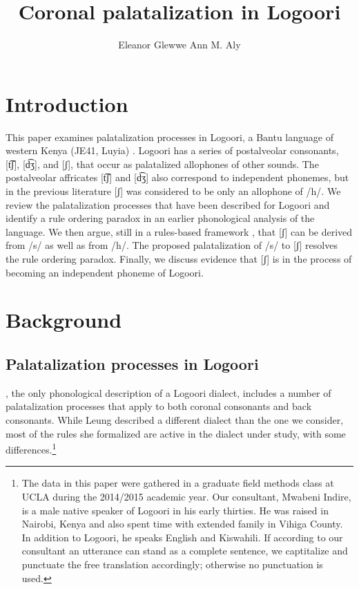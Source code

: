 \documentclass[output=paper]{langsci/langscibook}
\title{Coronal palatalization in Logoori}
\author{%
 Eleanor Glewwe\affiliation{University of California, Los Angeles}\lastand 
 Ann M. Aly\affiliation{University of California, Los Angeles}
}
\begin{document}
 



\section{Introduction}

This paper examines palatalization processes in Logoori, a Bantu language of western Kenya (JE41, Luyia) \citep{Mould1981,Bastin2003}. Logoori has a series of postalveolar consonants, [t͡ʃ], [d͡ʒ], and [ʃ], that occur as palatalized allophones of other sounds. The postalveolar affricates [t͡ʃ] and [d͡ʒ] also correspond to independent phonemes, but in the previous literature [ʃ] was considered to be only an allophone of /h/. We review the palatalization processes that have been described for Logoori and identify a rule ordering paradox in an earlier phonological analysis of the language. We then argue, still in a rules-based framework \citep{ChomskyHalle1968}, that [ʃ] can be derived from /s/ as well as from /h/. The proposed palatalization of /s/ to [ʃ] resolves the rule ordering paradox. Finally, we discuss evidence that [ʃ] is in the process of becoming an independent phoneme of Logoori.

\section{Background}
\subsection{Palatalization processes in Logoori} %

\citet{Leung1991}, the only phonological description of a Logoori dialect, includes a number of palatalization processes that apply to both coronal consonants and back consonants. While Leung described a different dialect than the one we consider, most of the rules she formalized are active in the dialect under study, with some differences.\footnote{The data in this paper were gathered in a graduate field methods class at UCLA during the 2014/2015 academic year. Our consultant, Mwabeni Indire, is a male native speaker of Logoori in his early thirties. He was raised in Nairobi, Kenya and also spent time with extended family in Vihiga County. In addition to Logoori, he speaks English and Kiswahili. If according to our consultant an utterance can stand as a complete sentence, we captitalize and punctuate the free translation accordingly; otherwise no punctuation is used.} 
\end{document}
